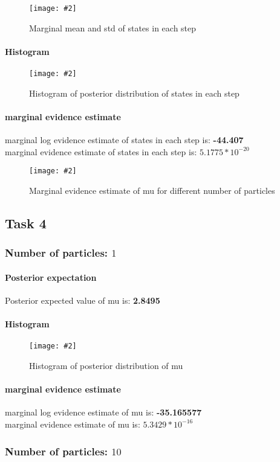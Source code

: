 \documentclass{article}
\newcommand{\centerfigcap}[3]{\begin{figure}[H]
\begin{center}\texttt{[image: \#2]} \caption{#3}\end{center}
\end{figure}}
\begin{document}
\centerfigcap{0.6}{../Figures/Mean-Std_3_5}{Marginal mean and std of states in each step}
\paragraph{Histogram}
\centerfigcap{0.6}{../Figures/Histogram_3_5}{Histogram of posterior distribution of states in each step}
\paragraph{marginal evidence estimate}
marginal log evidence estimate of states in each step is: \textbf{-44.407}\\
marginal evidence estimate of states in each step is: \textbf{$5.1775*10^{-20}$}\\

\centerfigcap{0.6}{../Figures/Evidence_3}{Marginal evidence estimate of mu for different number of particles}


\pagebreak
\subsection{Task 4}
\subsubsection{Number of particles: $1$}
\paragraph{Posterior expectation}
Posterior expected value of mu is: \textbf{2.8495}\\

\paragraph{Histogram}
\centerfigcap{0.6}{../Figures/Histogram_4_0}{Histogram of posterior distribution of mu}
\paragraph{marginal evidence estimate}
marginal log evidence estimate of mu is: \textbf{-35.165577}\\
marginal evidence estimate of mu is: \textbf{$5.3429 * 10^{-16}$}\\

\pagebreak
\subsubsection{Number of particles: $10$}
\end{document}
